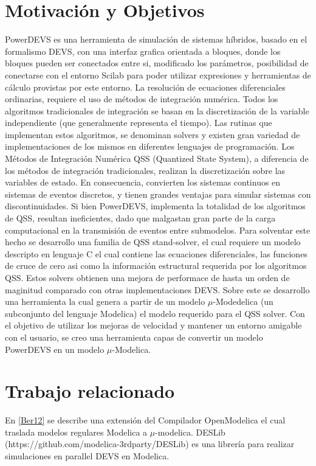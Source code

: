 \documentclass[a4paper,	11pt]{report}
\begin{document}
\section{Motivación y Objetivos}
PowerDEVS es una herramienta de simulación de sistemas híbridos, basado en el formalismo DEVS, con una interfaz grafica orientada a bloques, donde los bloques pueden ser conectados entre si, modificado los parámetros, posibilidad de conectarse con el entorno Scilab para poder utilizar expresiones y herramientas de cálculo provistas por este entorno.
La resolución de ecuaciones diferenciales ordinarias, requiere el uso de métodos de integración numérica. Todos los algoritmos tradicionales de integración se basan en la discretización de la variable independiente (que generalmente representa el tiempo). Las rutinas que implementan estos algoritmos, se denominan solvers y existen gran variedad de implementaciones de los mismos en diferentes lenguajes de programación. Los Métodos de Integración Numérica QSS (Quantized State System), a diferencia de los métodos de integración tradicionales, realizan la discretización sobre las variables de estado. En consecuencia, convierten los sistemas continuos en sistemas de eventos discretos, y tienen grandes ventajas para simular sistemas con discontinuidades.
Si bien PowerDEVS, implementa la totalidad de los algoritmos de QSS, resultan ineficientes, dado que malgastan gran parte de la carga computacional en la transmisión de eventos entre submodelos.
Para solventar este hecho se desarrollo una familia de QSS stand-solver, el cual requiere un modelo descripto en lenguaje C el cual contiene las ecuaciones diferenciales, las funciones de cruce de cero asi como la información estructural requerida por los algoritmos QSS. Estos solvers obtienen una mejora de performace de hasta un orden de maginitud comparado con otras implementaciones DEVS.
Sobre este se desarrollo una herramienta la cual genera a partir de un modelo $\mu$-Modedelica (un subconjunto del lenguaje Modelica) el modelo requerido para el QSS solver.
Con el objetivo de utilizar los mejoras de velocidad y mantener un entorno amigable con el usuario, se creo una herramienta capas de convertir un modelo PowerDEVS en un modelo $\mu$-Modelica.


\section{Trabajo relacionado}
En \ref{Ber12} se describe una extensión del Compilador OpenModelica el cual traslada modelos regulares Modelica a $\mu$-modelica. DESLib (https://github.com/modelica-3rdparty/DESLib) es una librería para realizar simulaciones en parallel DEVS en Modelica.
% 
\end{document}
